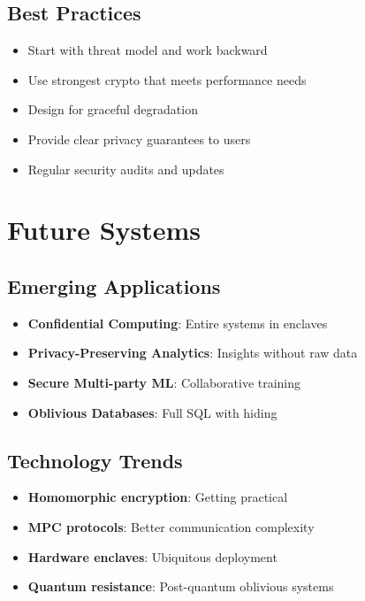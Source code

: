 \documentclass[11pt,final,hidelinks]{article}
\begin{document}
{\subsection{Best Practices}

\begin{itemize}
    \item Start with threat model and work backward
    \item Use strongest crypto that meets performance needs
    \item Design for graceful degradation
    \item Provide clear privacy guarantees to users
    \item Regular security audits and updates
\end{itemize}

\section{Future Systems}

\subsection{Emerging Applications}

\begin{itemize}
    \item \textbf{Confidential Computing}: Entire systems in enclaves
    \item \textbf{Privacy-Preserving Analytics}: Insights without raw data
    \item \textbf{Secure Multi-party ML}: Collaborative training
    \item \textbf{Oblivious Databases}: Full SQL with hiding
\end{itemize}

\subsection{Technology Trends}

\begin{itemize}
    \item \textbf{Homomorphic encryption}: Getting practical
    \item \textbf{MPC protocols}: Better communication complexity
    \item \textbf{Hardware enclaves}: Ubiquitous deployment
    \item \textbf{Quantum resistance}: Post-quantum oblivious systems
\end{itemize}

}
\end{document}
